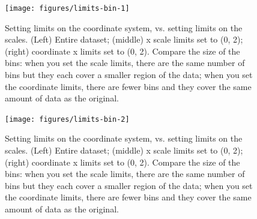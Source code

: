 \begin{Shaded}
\begin{Highlighting}[]
\StringTok{ }\StringTok{ }
\StringTok{  }\NormalTok{(} \NormalTok{, }\NormalTok{) +}\StringTok{ }
\StringTok{  }\NormalTok{(} \NormalTok{)) }
\end{Highlighting}
\end{Shaded}

\begin{figure}
\texttt{[image: figures/limits-bin-1]} \caption{Setting limits on the coordinate system, vs. setting limits on the scales.  (Left) Entire dataset; (middle) x scale limits set to (0, 2); (right) coordinate x limits set to (0, 2).  Compare the size of the bins: when you set the scale limits, there are the same number of bins but they each cover a smaller region of the data; when you set the coordinate limits, there are fewer bins and they cover the same amount of data as the original.\label{fig:limits-bin1}}
\end{figure}

\begin{Shaded}
\begin{Highlighting}[]
\StringTok{ }\NormalTok{(} \NormalTok{(}\NormalTok{, }\NormalTok{))}
\end{Highlighting}
\end{Shaded}

\begin{figure}
\texttt{[image: figures/limits-bin-2]} \caption{Setting limits on the coordinate system, vs. setting limits on the scales.  (Left) Entire dataset; (middle) x scale limits set to (0, 2); (right) coordinate x limits set to (0, 2).  Compare the size of the bins: when you set the scale limits, there are the same number of bins but they each cover a smaller region of the data; when you set the coordinate limits, there are fewer bins and they cover the same amount of data as the original.\label{fig:limits-bin2}}
\end{figure}

\begin{Shaded}
\begin{Highlighting}[]
\StringTok{ }\NormalTok{(} \NormalTok{(}\NormalTok{, }\NormalTok{))}
\end{Highlighting}
\end{Shaded}

